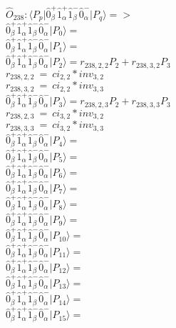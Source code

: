\documentclass[14pt]{article}
\begin{document}
    $\hat{O}_{238}:  \langle{P_p}\vert \hat{0}_{\beta}^{+}\hat{1}_{\alpha}^{+}\hat{1}_{\beta}^{-}\hat{0}_{\alpha}^{-} \vert{P_q}\rangle => $ \\ 
    $ \hat{0}_{\beta}^{+}\hat{1}_{\alpha}^{+}\hat{1}_{\beta}^{-}\hat{0}_{\alpha}^{-} \vert{P_{0}}\rangle =  $ \\ 
    $ \hat{0}_{\beta}^{+}\hat{1}_{\alpha}^{+}\hat{1}_{\beta}^{-}\hat{0}_{\alpha}^{-} \vert{P_{1}}\rangle =  $ \\ 
    $ \hat{0}_{\beta}^{+}\hat{1}_{\alpha}^{+}\hat{1}_{\beta}^{-}\hat{0}_{\alpha}^{-} \vert{P_{2}}\rangle = {r}_{238,2,2}P_{2}+{r}_{238,3,2}P_{3} $ \\ 
    ${r}_{238,2,2}\ =\ {ci}_{2,2}*{inv}_{3,2} $ \\ 
    ${r}_{238,3,2}\ =\ {ci}_{2,2}*{inv}_{3,3} $ \\ 
    $ \hat{0}_{\beta}^{+}\hat{1}_{\alpha}^{+}\hat{1}_{\beta}^{-}\hat{0}_{\alpha}^{-} \vert{P_{3}}\rangle = {r}_{238,2,3}P_{2}+{r}_{238,3,3}P_{3} $ \\ 
    ${r}_{238,2,3}\ =\ {ci}_{3,2}*{inv}_{3,2} $ \\ 
    ${r}_{238,3,3}\ =\ {ci}_{3,2}*{inv}_{3,3} $ \\ 
    $ \hat{0}_{\beta}^{+}\hat{1}_{\alpha}^{+}\hat{1}_{\beta}^{-}\hat{0}_{\alpha}^{-} \vert{P_{4}}\rangle =  $ \\ 
    $ \hat{0}_{\beta}^{+}\hat{1}_{\alpha}^{+}\hat{1}_{\beta}^{-}\hat{0}_{\alpha}^{-} \vert{P_{5}}\rangle =  $ \\ 
    $ \hat{0}_{\beta}^{+}\hat{1}_{\alpha}^{+}\hat{1}_{\beta}^{-}\hat{0}_{\alpha}^{-} \vert{P_{6}}\rangle =  $ \\ 
    $ \hat{0}_{\beta}^{+}\hat{1}_{\alpha}^{+}\hat{1}_{\beta}^{-}\hat{0}_{\alpha}^{-} \vert{P_{7}}\rangle =  $ \\ 
    $ \hat{0}_{\beta}^{+}\hat{1}_{\alpha}^{+}\hat{1}_{\beta}^{-}\hat{0}_{\alpha}^{-} \vert{P_{8}}\rangle =  $ \\ 
    $ \hat{0}_{\beta}^{+}\hat{1}_{\alpha}^{+}\hat{1}_{\beta}^{-}\hat{0}_{\alpha}^{-} \vert{P_{9}}\rangle =  $ \\ 
    $ \hat{0}_{\beta}^{+}\hat{1}_{\alpha}^{+}\hat{1}_{\beta}^{-}\hat{0}_{\alpha}^{-} \vert{P_{10}}\rangle =  $ \\ 
    $ \hat{0}_{\beta}^{+}\hat{1}_{\alpha}^{+}\hat{1}_{\beta}^{-}\hat{0}_{\alpha}^{-} \vert{P_{11}}\rangle =  $ \\ 
    $ \hat{0}_{\beta}^{+}\hat{1}_{\alpha}^{+}\hat{1}_{\beta}^{-}\hat{0}_{\alpha}^{-} \vert{P_{12}}\rangle =  $ \\ 
    $ \hat{0}_{\beta}^{+}\hat{1}_{\alpha}^{+}\hat{1}_{\beta}^{-}\hat{0}_{\alpha}^{-} \vert{P_{13}}\rangle =  $ \\ 
    $ \hat{0}_{\beta}^{+}\hat{1}_{\alpha}^{+}\hat{1}_{\beta}^{-}\hat{0}_{\alpha}^{-} \vert{P_{14}}\rangle =  $ \\ 
    $ \hat{0}_{\beta}^{+}\hat{1}_{\alpha}^{+}\hat{1}_{\beta}^{-}\hat{0}_{\alpha}^{-} \vert{P_{15}}\rangle =  $ \\ 
    
\end{document}

